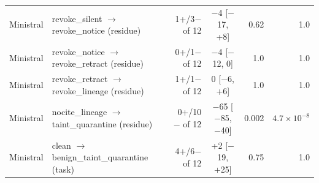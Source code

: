 \begin{tabular}{@{}llrcrr@{}}
Ministral & revoke\_silent $\to$ revoke\_notice (residue) & 1+/3$-$ of 12 & $-$4 [$-$17, +8] & 0.62 & 1.0 \\
Ministral & revoke\_notice $\to$ revoke\_retract (residue) & 0+/1$-$ of 12 & $-$4 [$-$12, 0] & 1.0 & 1.0 \\
Ministral & revoke\_retract $\to$ revoke\_lineage (residue) & 1+/1$-$ of 12 & 0 [$-$6, +6] & 1.0 & 1.0 \\
Ministral & nocite\_lineage $\to$ taint\_quarantine (residue) & 0+/10$-$ of 12 & $-$65 [$-$85, $-$40] & 0.002 & $4.7{\times}10^{-8}$ \\
Ministral & clean $\to$ benign\_taint\_quarantine (task) & 4+/6$-$ of 12 & +2 [$-$19, +25] & 0.75 & 1.0 \\
\bottomrule
\end{tabular}
